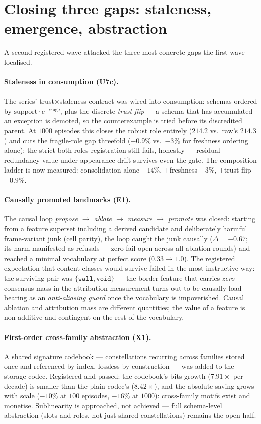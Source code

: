 \documentclass{article}
\begin{document}
\section{Closing three gaps: staleness, emergence, abstraction}
\label{sec:gaps}

A second registered wave attacked the three most concrete gaps the
first wave localised.

\paragraph{Staleness in consumption (U7c).} The series'
trust$\times$staleness contract was wired into consumption: schemas
ordered by $\text{support}\cdot e^{-\alpha\,\text{age}}$, plus the
discrete \emph{trust-flip} --- a schema that has accumulated an
exception is demoted, so the counterexample is tried before its
discredited parent. At $1000$ episodes this closes the robust role
entirely ($214.2$ vs.\ raw's $214.3$) and cuts the fragile-role gap
threefold ($-0.9\%$ vs.\ $-3\%$ for freshness ordering alone); the
strict both-roles registration still fails, honestly --- residual
redundancy value under appearance drift survives even the gate. The
composition ladder is now measured: consolidation alone $-14\%$,
$+$freshness $-3\%$, $+$trust-flip $-0.9\%$.

\paragraph{Causally promoted landmarks (E1).} The causal loop
\emph{propose $\to$ ablate $\to$ measure $\to$ promote} was closed:
starting from a feature superset including a derived candidate and
deliberately harmful frame-variant junk (cell parity), the loop
caught the junk causally ($\Delta = -0.67$; its harm manifested as
refusals --- zero fail-open across all ablation rounds) and reached a
minimal vocabulary at perfect score ($0.33 \to 1.0$). The registered
expectation that content classes would survive failed in the most
instructive way: the surviving pair was $\{\texttt{wall},
\texttt{void}\}$ --- the border feature that carries \emph{zero}
consensus mass in the attribution measurement turns out to be
causally load-bearing as an \emph{anti-aliasing guard} once the
vocabulary is impoverished. Causal ablation and attribution mass are
different quantities; the value of a feature is non-additive and
contingent on the rest of the vocabulary.

\paragraph{First-order cross-family abstraction (X1).} A shared
signature codebook --- constellations recurring across families
stored once and referenced by index, lossless by construction ---
was added to the storage codec. Registered and passed: the codebook's
bits growth ($7.91\times$ per decade) is smaller than the plain
codec's ($8.42\times$), and the absolute saving grows with scale
($-10\%$ at $100$ episodes, $-16\%$ at $1000$): cross-family motifs
exist and monetise. Sublinearity is approached, not achieved ---
full schema-level abstraction (slots and roles, not just shared
constellations) remains the open half.
\end{document}
